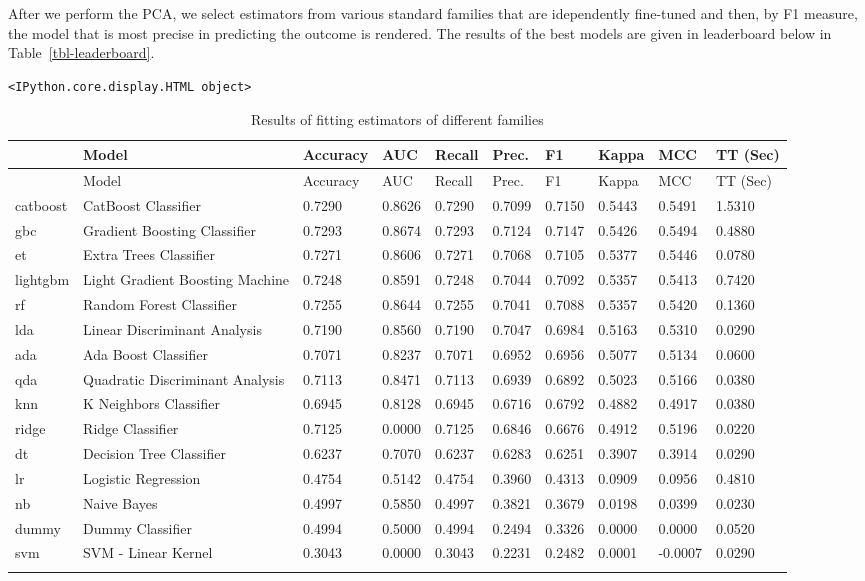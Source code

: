 \documentclass[
  letterpaper,
  DIV=11,
  numbers=noendperiod]{scrartcl}
\begin{document}
After we perform the PCA, we select estimators from various standard
families that are idependently fine-tuned and then, by F1 measure, the
model that is most precise in predicting the outcome is rendered. The
results of the best models are given in leaderboard below in
Table~\ref{tbl-leaderboard}.

\begin{verbatim}
<IPython.core.display.HTML object>
\end{verbatim}

\hypertarget{tbl-leaderboard}{}
\begin{longtable}[]{@{}llllllllll@{}}
\toprule\noalign{}
~ & Model & Accuracy & AUC & Recall & Prec. & F1 & Kappa & MCC & TT
(Sec) \\
\midrule\noalign{}
\endfirsthead
\toprule\noalign{}
~ & Model & Accuracy & AUC & Recall & Prec. & F1 & Kappa & MCC & TT
(Sec) \\
\midrule\noalign{}
\endhead
\bottomrule\noalign{}
\endlastfoot
catboost & CatBoost Classifier & 0.7290 & 0.8626 & 0.7290 & 0.7099 &
0.7150 & 0.5443 & 0.5491 & 1.5310 \\
gbc & Gradient Boosting Classifier & 0.7293 & 0.8674 & 0.7293 & 0.7124 &
0.7147 & 0.5426 & 0.5494 & 0.4880 \\
et & Extra Trees Classifier & 0.7271 & 0.8606 & 0.7271 & 0.7068 & 0.7105
& 0.5377 & 0.5446 & 0.0780 \\
lightgbm & Light Gradient Boosting Machine & 0.7248 & 0.8591 & 0.7248 &
0.7044 & 0.7092 & 0.5357 & 0.5413 & 0.7420 \\
rf & Random Forest Classifier & 0.7255 & 0.8644 & 0.7255 & 0.7041 &
0.7088 & 0.5357 & 0.5420 & 0.1360 \\
lda & Linear Discriminant Analysis & 0.7190 & 0.8560 & 0.7190 & 0.7047 &
0.6984 & 0.5163 & 0.5310 & 0.0290 \\
ada & Ada Boost Classifier & 0.7071 & 0.8237 & 0.7071 & 0.6952 & 0.6956
& 0.5077 & 0.5134 & 0.0600 \\
qda & Quadratic Discriminant Analysis & 0.7113 & 0.8471 & 0.7113 &
0.6939 & 0.6892 & 0.5023 & 0.5166 & 0.0380 \\
knn & K Neighbors Classifier & 0.6945 & 0.8128 & 0.6945 & 0.6716 &
0.6792 & 0.4882 & 0.4917 & 0.0380 \\
ridge & Ridge Classifier & 0.7125 & 0.0000 & 0.7125 & 0.6846 & 0.6676 &
0.4912 & 0.5196 & 0.0220 \\
dt & Decision Tree Classifier & 0.6237 & 0.7070 & 0.6237 & 0.6283 &
0.6251 & 0.3907 & 0.3914 & 0.0290 \\
lr & Logistic Regression & 0.4754 & 0.5142 & 0.4754 & 0.3960 & 0.4313 &
0.0909 & 0.0956 & 0.4810 \\
nb & Naive Bayes & 0.4997 & 0.5850 & 0.4997 & 0.3821 & 0.3679 & 0.0198 &
0.0399 & 0.0230 \\
dummy & Dummy Classifier & 0.4994 & 0.5000 & 0.4994 & 0.2494 & 0.3326 &
0.0000 & 0.0000 & 0.0520 \\
svm & SVM - Linear Kernel & 0.3043 & 0.0000 & 0.3043 & 0.2231 & 0.2482 &
0.0001 & -0.0007 & 0.0290 \\
\caption{\label{tbl-leaderboard}Results of fitting estimators of
different families}\label{T_96c03}\tabularnewline
\end{longtable}
\end{document}
